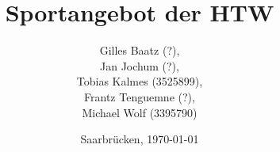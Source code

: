 \begin{titlepage}

	\titlehead
	{
		\hfill
		\texttt{[image: images/logos/HTW.png]}
		\hfill
	}
	
	\subject
	{
		\Huge Dokumentation\\
		\normalsize Semantische Interoperabilit\"at\\
	}
	
	\title
	{
		Sportangebot der HTW
	}
	
	\author
	{		
		Gilles Baatz (?),\\
		Jan Jochum (?),\\
		Tobias Kalmes (3525899),\\
		Frantz Tenguemne (?),\\
		Michael Wolf (3395790)		
	}
	
	\date
	{
		\normalsize{Saarbrücken, \today}
	}	
	\maketitle	
\end{titlepage}